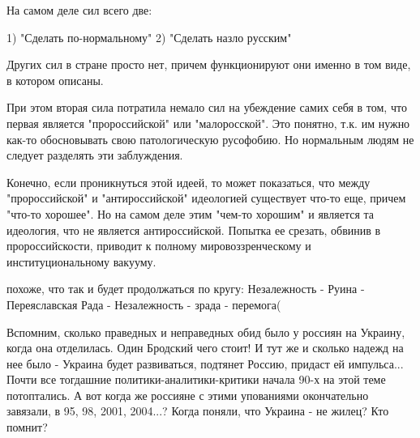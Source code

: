 \begin{itemize}
На самом деле сил всего две:

1) "Сделать по-нормальному" 2) "Сделать назло русским"

Других сил в стране просто нет, причем функционируют они именно в том виде, в
котором описаны.

При этом вторая сила потратила немало сил на убеждение самих себя в том, что
первая является "пророссийской" или "малоросской". Это понятно, т.к. им нужно
как-то обосновывать свою патологическую русофобию. Но нормальным людям не
следует разделять эти заблуждения.

Конечно, если проникнуться этой идеей, то может показаться, что между
"пророссийской" и "антироссийской" идеологией существует что-то еще, причем
"что-то хорошее". Но на самом деле этим "чем-то хорошим" и является та
идеология, что не является антироссийской. Попытка ее срезать, обвинив в
пророссийскости, приводит к полному мировоззренческому и институциональному
вакууму.

\begin{itemize} %
похоже, что так и будет продолжаться по кругу: Незалежность - Руина - Переяславская Рада - Незалежность - зрада - перемога(
\end{itemize} %


Вспомним, сколько праведных и неправедных обид было у россиян на Украину, когда
она отделилась. Один Бродский чего стоит! И тут же и сколько надежд на нее было
- Украина будет развиваться, подтянет Россию, придаст ей импульса... Почти все
тогдашние политики-аналитики-критики начала 90-х на этой теме потоптались. А
вот когда же россияне с этими упованиями окончательно завязали, в 95, 98, 2001,
2004...? Когда поняли, что Украина - не жилец? Кто помнит?

\end{itemize} %
